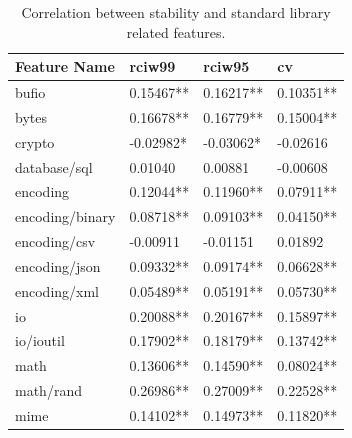 \documentclass{seal_thesis}
\begin{document}
\begin{table}[H]
	\centering
	\caption{Correlation between stability and standard library related features.}
	\label{table:standardlibraries}
	\begin{tabular}{@{}llll@{}}
		Feature Name & rciw99 & rciw95 & cv \\
		\toprule
		bufio & \cellcolor[HTML]{99CCFF}0.15467** & \cellcolor[HTML]{99CCFF}0.16217** & \cellcolor[HTML]{99CCFF}0.10351** \\
		bytes & \cellcolor[HTML]{99CCFF}0.16678** & \cellcolor[HTML]{99CCFF}0.16779** & \cellcolor[HTML]{99CCFF}0.15004** \\
		crypto & \cellcolor[HTML]{333399}\color{white}-0.02982* & \cellcolor[HTML]{333399}\color{white}-0.03062* & \cellcolor[HTML]{333399}\color{white}-0.02616 \\
		database/sql & \cellcolor[HTML]{333399}\color{white}0.01040 & \cellcolor[HTML]{333399}\color{white}0.00881 & \cellcolor[HTML]{333399}\color{white}-0.00608 \\
		encoding & \cellcolor[HTML]{99CCFF}0.12044** & \cellcolor[HTML]{99CCFF}0.11960** & \cellcolor[HTML]{99CCFF}0.07911** \\
		encoding/binary & \cellcolor[HTML]{99CCFF}0.08718** & \cellcolor[HTML]{99CCFF}0.09103** & \cellcolor[HTML]{3366FF}0.04150** \\
		encoding/csv & \cellcolor[HTML]{333399}\color{white}-0.00911 & \cellcolor[HTML]{333399}\color{white}-0.01151 & \cellcolor[HTML]{3366FF}0.01892 \\
		encoding/json & \cellcolor[HTML]{99CCFF}0.09332** & \cellcolor[HTML]{99CCFF}0.09174** & \cellcolor[HTML]{3366FF}0.06628** \\
		encoding/xml & \cellcolor[HTML]{3366FF}0.05489** & \cellcolor[HTML]{3366FF}0.05191** & \cellcolor[HTML]{3366FF}0.05730** \\
		io & \cellcolor[HTML]{99CCFF}0.20088** & \cellcolor[HTML]{99CCFF}0.20167** & \cellcolor[HTML]{99CCFF}0.15897** \\
		io/ioutil & \cellcolor[HTML]{99CCFF}0.17902** & \cellcolor[HTML]{99CCFF}0.18179** & \cellcolor[HTML]{99CCFF}0.13742** \\
		math & \cellcolor[HTML]{99CCFF}0.13606** & \cellcolor[HTML]{99CCFF}0.14590** & \cellcolor[HTML]{99CCFF}0.08024** \\
		math/rand & \cellcolor[HTML]{FFCC99}0.26986** & \cellcolor[HTML]{FFCC99}0.27009** & \cellcolor[HTML]{C0C0C0}0.22528** \\
		mime & \cellcolor[HTML]{99CCFF}0.14102** & \cellcolor[HTML]{99CCFF}0.14973** & \cellcolor[HTML]{99CCFF}0.11820** \\

\end{tabular}
\end{table}
\end{document}

